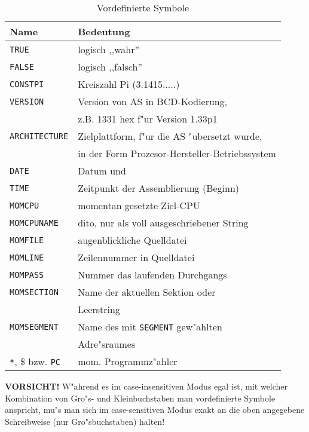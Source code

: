 \documentclass[12pt,a4paper,twoside]{report}
\newcommand{\bb}[1]{{\bf #1}}
\newcommand{\tty}[1]{{\tt #1}}
\begin{document}
\begin{table*}[p]
\begin{center}\begin{tabular}{|l|l|}
\hline
Name             & Bedeutung \\
\hline
\hline
\tty{TRUE}             & logisch ,,wahr'' \\
\tty{FALSE}            & logisch ,,falsch'' \\
\tty{CONSTPI}          & Kreiszahl Pi (3.1415.....) \\
\tty{VERSION}          & Version von AS in BCD-Kodierung, \\
                       & z.B. 1331 hex f"ur Version 1.33p1 \\
\tty{ARCHITECTURE}     & Zielplattform, f"ur die AS "ubersetzt wurde, \\
                       & in der Form Prozesor-Hersteller-Betriebssystem \\
\tty{DATE}             & Datum und \\
\tty{TIME}             & Zeitpunkt der Assemblierung (Beginn) \\
\tty{MOMCPU}           & momentan gesetzte Ziel-CPU \\
\tty{MOMCPUNAME}       & dito, nur als voll ausgeschriebener String \\
\tty{MOMFILE}          & augenblickliche Quelldatei \\
\tty{MOMLINE}          & Zeilennummer in Quelldatei \\
\tty{MOMPASS}          & Nummer das laufenden Durchgangs \\
\tty{MOMSECTION}       & Name der aktuellen Sektion oder \\
                       & Leerstring \\
\tty{MOMSEGMENT}       & Name des mit \tty{SEGMENT} gew"ahlten \\
                       & Adre"sraumes \\
\verb!*!, \$ bzw. \tty{PC} & mom. Programmz"ahler \\
\hline
\end{tabular}\end{center}
\caption{Vordefinierte Symbole\label{TabPredefined}}
\end{table*}
\bb{VORSICHT!}  W"ahrend es im case-insensitiven Modus egal ist,
mit welcher Kombination von Gro"s- und Kleinbuchstaben man
vordefinierte Symbole anspricht, mu"s man sich im case-sensitiven
Modus exakt an die oben angegebene Schreibweise (nur Gro"sbuchstaben)
halten!
\par
\end{document}
